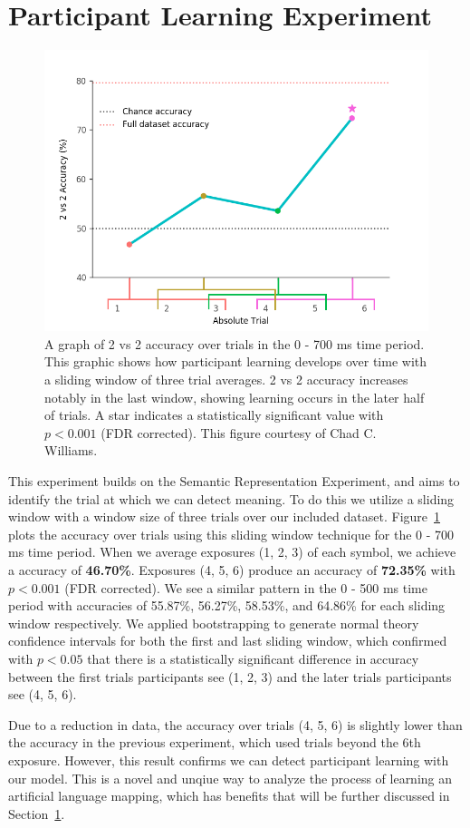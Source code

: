\section{Participant Learning Experiment}
\label{sec:results:participantlearning}

\begin{figure}[t]
  \centering
  \includegraphics[width=0.75\linewidth]{figures/learning}
  \caption[\tvt Accuracy over Trials]{
    A graph of 2 vs 2 accuracy over trials in the 0 - 700 ms time period. This 
    graphic shows how participant learning develops over time with a sliding 
    window of three trial averages.  2 vs 2 accuracy increases notably in the 
    last window, showing learning occurs in the later half of trials. A star 
    indicates a statistically significant value with $p < 0.001$ (FDR 
    corrected). This figure courtesy of Chad C. Williams.
  }
  \label{fig:learning}
\end{figure}

This experiment builds on the Semantic Representation Experiment, and aims to 
identify the trial at which we can detect meaning. To do this we utilize a 
sliding window with a window size of three trials over our included dataset.   
Figure~\ref{fig:learning} plots the \tvt accuracy over trials using this 
sliding window technique for the 0 - 700 ms time period. When we average 
exposures (1, 2, 3) of each symbol, we achieve a \tvt accuracy of 
\textbf{46.70\%}.  Exposures (4, 5, 6) produce an accuracy of \textbf{72.35\%} 
with $p < 0.001$ (FDR corrected). We see a similar pattern in the 0 - 500 ms 
time period with accuracies of 55.87\%, 56.27\%, 58.53\%, and 64.86\% for each 
sliding window respectively. We applied bootstrapping to generate normal theory 
confidence intervals for both the first and last sliding window, which 
confirmed with $p < 0.05$ that there is a statistically significant difference 
in \tvt accuracy between the first trials participants see (1, 2, 3) and the 
later trials participants see (4, 5, 6).

Due to a reduction in data, the \tvt accuracy over trials (4, 5, 6) is slightly 
lower than the \tvt accuracy in the previous experiment, which used trials 
beyond the 6th exposure. However, this result confirms we can detect 
participant learning with our model. This is a novel and unqiue way to analyze 
the process of learning an artificial language mapping, which has benefits that 
will be further discussed in Section~\ref{sec:results:participantlearning}.
